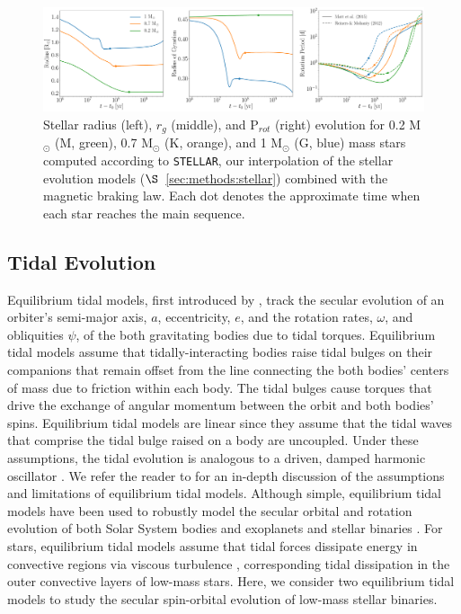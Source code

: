 \documentclass[twocolumn]{aastex61}
\newcommand{\stellar}[0]{\texttt{STELLAR}\xspace}
\begin{document}
\begin{figure}[ht]
	\includegraphics[width=\textwidth]{../Plots/stellarExample.pdf}
   \caption{Stellar radius (left), $r_g$ (middle), and P$_{rot}$ (right) evolution for 0.2 M$_{\odot}$ (M, green), 0.7 M$_{\odot}$ (K, orange), and 1 M$_{\odot}$ (G, blue) mass stars computed according to \stellar, our interpolation of the \citet{Baraffe2015} stellar evolution models ($\S$~\ref{sec:methods:stellar}) combined with the \citet{Matt2015} magnetic braking law. Each dot denotes the approximate time when each star reaches the main sequence.}%
    \label{fig:stellarExample}%
\end{figure}

\subsection{Tidal Evolution} \label{sec:methods:eqtide}

 Equilibrium tidal models, first introduced by \citep{Darwin1880}, track the secular evolution of an orbiter's semi-major axis, $a$, eccentricity, $e$, and the rotation rates, $\omega$, and obliquities $\psi$, of the both gravitating bodies due to tidal torques. Equilibrium tidal models assume that tidally-interacting bodies raise tidal bulges on their companions that remain offset from the line connecting the both bodies' centers of mass due to friction within each body.  The tidal bulges cause torques that drive the exchange of angular momentum between the orbit and both bodies' spins. Equilibrium tidal models are linear since they assume that the tidal waves that comprise the tidal bulge raised on a body are uncoupled. Under these assumptions, the tidal evolution is analogous to a driven, damped harmonic oscillator \citep{Greenberg2009}. We refer the reader to \citet{Barnes2017} for an in-depth discussion of the assumptions and limitations of equilibrium tidal models.  Although simple, equilibrium tidal models have been used to robustly model the secular orbital and rotation evolution of both Solar System bodies and exoplanets \citet[e.g.][]{Goldreich1966,Jackson2009,Leconte2010,Heller2011,Barnes2013,Barnes2017} and stellar binaries \citep[e.g.][]{Zahn1989,Zahn2008,Khaliullin2011,Repetto2014,Fleming2018}. For stars, equilibrium tidal models assume that tidal forces dissipate energy in convective regions via viscous turbulence \citep[see][]{Zahn2008}, corresponding tidal dissipation in the outer convective layers of low-mass stars. Here, we consider two equilibrium tidal models to study the secular spin-orbital evolution of low-mass stellar binaries.  
\end{document}
